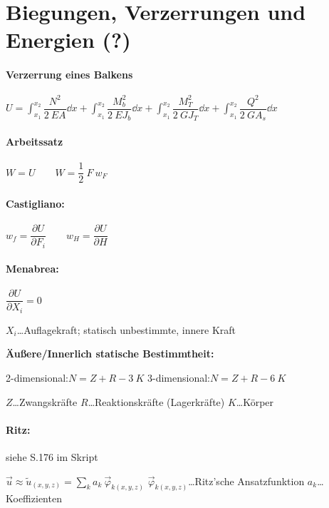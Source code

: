 \section{Biegungen, Verzerrungen und Energien (?)}

\paragraph{ Verzerrung eines Balkens}
	$ U = \displaystyle\int_{x_1}^{x_2} \dfrac{N^2}  {2\ E A}   \dd x
	    + \displaystyle\int_{x_1}^{x_2} \dfrac{M_b^2}{2\ E J_b} \dd x 
	    + \displaystyle\int_{x_1}^{x_2} \dfrac{M_T^2}{2\ G J_T} \dd x 
	    + \displaystyle\int_{x_1}^{x_2} \dfrac{Q^2}  {2\ G A_s} \dd x $

\paragraph{ Arbeitssatz}
	$ W = U \qquad 
		W = \dfrac{1}{2}\ F\ w_F$

\paragraph{ Castigliano:}
	$ w_f  = \dfrac{\partial U}{\partial F_i} \qquad w_H = \dfrac{\partial U}{\partial H} $
	
\paragraph{ Menabrea:}
	$ \dfrac{\partial U}{\partial X_i} = 0 $
		
		\vskip 3pt
	$ X_i $\dots Auflagekraft; statisch unbestimmte, innere Kraft
	
	\textbf{Äußere/Innerlich statische Bestimmtheit:}
	
	2-dimensional:\quad $ N = Z + R - 3\ K $
		\hfil 3-dimensional:\quad $ N = Z + R - 6\ K $ \hfil
	
	$ Z $\dots Zwangskräfte
		\qquad $ R $\dots Reaktionskräfte (Lagerkräfte)
		\qquad $ K $\dots Körper
	
\paragraph{ Ritz:} \quad siehe S.176 im Skript
	
	$ \vec{u} \approx \tilde{u}_{(x,y,z)} = \displaystyle\sum_k a_k\ \vec{\varphi}_{k(x,y,z)} $
		\qquad $ \vec{\varphi}_{k(x,y,z)} $\dots Ritz'sche Ansatzfunktion
		\qquad $ a_k $\dots Koeffizienten
	
